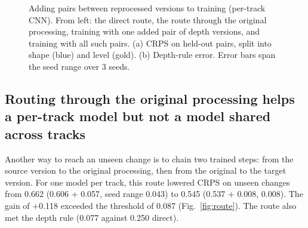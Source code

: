 \documentclass[pdflatex,sn-mathphys-num]{sn-jnl}
\newcommand{\lit}[1]{#1}
\newcommand{\ptBar}{0.087}
\newcommand{\ptDir}{0.662}
\newcommand{\ptDirOS}{0.606}
\newcommand{\ptDirS}{0.043}
\newcommand{\ptDirSE}{0.057}
\newcommand{\ptGain}{\ensuremath{+}0.118}
\newcommand{\ptRuleDir}{0.250}
\newcommand{\ptRuleVia}{0.077}
\newcommand{\ptVia}{0.545}
\newcommand{\ptViaOS}{0.537}
\newcommand{\ptViaS}{0.008}
\newcommand{\ptViaSE}{0.008}
\begin{document}
\begin{figure}[t]
\centering
{}
\caption{Adding pairs between reprocessed versions to training (per-track CNN). From left: the
direct route, the route through the original processing, training with one added pair of
depth versions, and training with all such pairs. (a) CRPS on held-out pairs, split into shape
(blue) and level (gold). (b) Depth-rule error. Error bars span the seed range over \lit{3}
seeds.}\label{fig:arm}
\end{figure}

\subsection{Routing through the original processing helps a per-track model but not a model shared across tracks}\label{sec:r8}

Another way to reach an unseen change is to chain two trained steps: from the source version
to the original processing, then from the original to the target version. For one model per
track, this route lowered CRPS on unseen changes from \ptDir{} (\ptDirOS{} + \ptDirSE{}, seed
range \ptDirS{}) to \ptVia{} (\ptViaOS{} + \ptViaSE{}, \ptViaS{}). The gain of \ptGain{} exceeded
the threshold of \ptBar{} (Fig.~\ref{fig:route}). The route also met the depth rule (\ptRuleVia{}
against \ptRuleDir{} direct).
\end{document}
